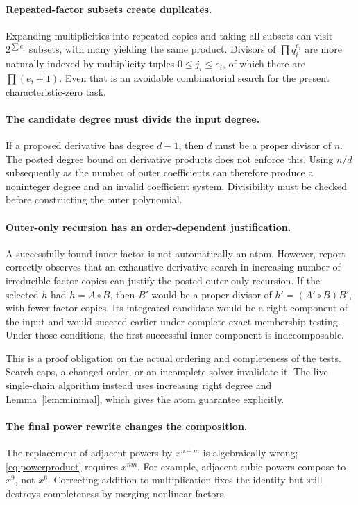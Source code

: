 \documentclass[11pt,a4paper]{article}
\numberwithin{equation}{section}
\theoremstyle{definition}
\theoremstyle{remark}
\begin{document}
\paragraph{Repeated-factor subsets create duplicates.}
Expanding multiplicities into repeated copies and taking all subsets can
visit $2^{\sum e_i}$ subsets, with many yielding the same product. Divisors
of $\prod q_i^{e_i}$ are more naturally indexed by multiplicity tuples
$0\le j_i\le e_i$, of which there are $\prod(e_i+1)$. Even that is an
avoidable combinatorial search for the present characteristic-zero task.

\paragraph{The candidate degree must divide the input degree.}
If a proposed derivative has degree $d-1$, then $d$ must be a proper divisor
of $n$. The posted degree bound on derivative products does not enforce this.
Using $n/d$ subsequently as the number of outer coefficients can therefore
produce a noninteger degree and an invalid coefficient system. Divisibility
must be checked before constructing the outer polynomial.

\paragraph{Outer-only recursion has an order-dependent justification.}
A successfully found inner factor is not automatically an atom.  However,
report~\cite{r1} correctly observes that an exhaustive derivative search
in increasing number of irreducible-factor copies can justify the posted
outer-only recursion.  If the selected \(h\) had \(h=A\circ B\), then
\(B'\) would be a proper divisor of \(h'=(A'\circ B)B'\), with fewer
factor copies.  Its integrated candidate would be a right component of
the input and would succeed earlier under complete exact membership testing.
Under those conditions, the first successful inner component is indecomposable.

This is a proof obligation on the actual ordering and completeness of the
tests.  Search caps, a changed order, or an incomplete solver invalidate it.
The live single-chain algorithm instead uses increasing right degree and
Lemma~\ref{lem:minimal}, which gives the atom guarantee explicitly.

\paragraph{The final power rewrite changes the composition.}
The replacement of adjacent powers by $x^{n+m}$ is algebraically wrong;
\eqref{eq:powerproduct} requires $x^{nm}$. For example, adjacent cubic powers
compose to $x^9$, not $x^6$. Correcting addition to multiplication fixes the
identity but still destroys completeness by merging nonlinear factors.
\end{document}

